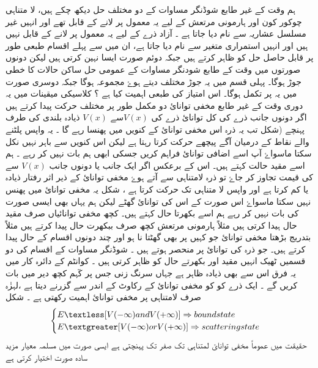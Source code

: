 
 ہم وقت کے غیر طابع شوڈنگر مساوات کے دو مختلف حل دیکھ چکے ہیں،  لا متناہی چوکور کون اور ہارمونی مرتعش کے لیے یہ معمول پر لانے کے قابل تھے اور انہیں غیر مسلسل عشاریہ سے نام دیا جاتا ہے ۔  آزاد ذرے کے لیے یہ معمول پر لانے کے قابل نہیں ہیں اور انہیں استمراری متغیر سے نام دیا جاتا ہے، ان میں سے پہلے اقسام طبعی طور پر قابل حاصل حل کو ظاہر کرتے ہیں جبکہ دوئم صورت ایسا نہین کرتی ہیں لیکن دونوں صورتوں میں وقت کے طابع شودنگر مساوات کے عمومی حل ساکن حالات کا خطی جوڑ ہوگا۔ پہلی قسم میں یہ جوڑ مختلف  دیتے ہوۓ مجموعہ ہوگا جبکہ دوسری صورت میں یہ  پر تکمل ہوگا۔ اس امتیاز کی طبعی اہمیت کیا ہے ؟ کلاسیکی میقینات میں یہ دوری وقت کے غیر طابع مخفی توانائ دو مکمل طور پر مختلف حرکت پیدا کرتے ہیں اگر دونوں جانب ذرے کی کل توانائ ذرے کی \( V(x)\)سے \( V(x)\) ذیادہ بلندی کی طرف پہنچے (شکل   تب یہ ذرہ اس مخفی توانائ کے کنویں میں پھنسا رہے گا ۔ یہ واپس پلٹنے والے نقاط کے درمیان آگے پیچھے حرکت کرتا رہتا ہے لیکن اس کنویں سے باہر نہیں نکل سکتا ماسواۓ آپ اسے اضافی توانائ فراہم کریں جسکی ابھی ہم بات نہیں کر رہے ۔ ہم اسے مقید حالت کہتے ہیں۔ اس کے برعکس اگر ایک جانب یا دونوں جانب \( V(x)\)  سے    کی قیمت تجاوز کر جاۓ تو ذرہ لامتناہی سے آتے ہوۓ مخفی توانائ کے ذیر اثر رفتار ذیادہ یا کم کرتا ہے اور واپس لا متناہی تک حرکت کرتا ہے ،  شکل  یہ مخفی توانائ میں پھنس نہیں سکتا ماسواۓ اس صورت  کے اس کی توانائ گھٹے لیکن ہم یہاں بھی ایسی صورت کی بات نہیں کر رہے ہم اسے بکھرتا حال کہتے ہیں۔ کچھ مخفی توانائیاں صرف مقید حال ہیدا کرتی ہیں مثلاً ہارمونی  مرتعش کچھ صرف ببکھرت حال پیدا کرتے ہیں مثلاً بتدریج بڑھتا مخفی توانائ جو کہیں پر بھی گھٹتا نا ہو اور چند دونوں اقسام کے حال پیدا کرتے ہیں۔ جو ذرہ کی توانائ پر منحصر ہوتے ہیں ۔ شوڈنگر مساوات کے اقسام کی دو قسمیں ٹھیک انہیں مقید اور بکھرتے حال کو ظاہر کرتی ہیں ۔ کوانٹم کے دائرہ کار میں یہ فرق اس سے بھی ذیادہ ظاہر ہے جہاں  سرنگ زنی   جس پر کٓہم کچھ دیر میں بات کریں گے ۔ ایک ذرے کو کو مخفی توانائ کے رکاوٹ کے اندر سے گزرنے دیتا ہے ،لہزٰہ صرف لامتناہی پر مخفی توانائ اہمیت رکھتی ہے ۔  شکل   
\begin{align}
\begin{cases}
E\textless[V(-\infty) and V(+\infty)]\Rightarrow bound state\\
E\textgreater[V(-\infty) or V(+\infty)]\Rightarrow scattering state
\end{cases}
\end{align} 
حقیقت میں عموماً مخفی توانائ لمتناہی تک صفر تک پہنچتی ہے ایسی صورت میں مسلمہ معیار مزید سادہ صورت اختیار کرتی ہے
